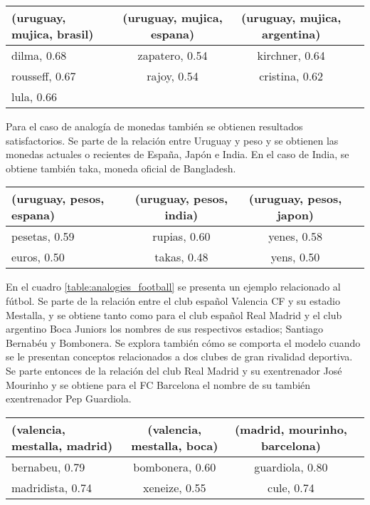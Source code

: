 \begin{table*}[ht]
    \centering
    \begin{tabular}{lccc}
        \hline
        (uruguay, mujica, brasil) & (uruguay, mujica, espana) & (uruguay, mujica, argentina)\\
        \hline
        dilma, 0.68 & zapatero, 0.54 & kirchner, 0.64\\
        rousseff, 0.67 & rajoy, 0.54 & cristina, 0.62\\
        lula, 0.66\\
        \hline
    \end{tabular}
    \caption{Analogías para países y presidentes.}
    \label{table:analogies_presidents}
\end{table*}

Para el caso de analogía de monedas también se obtienen resultados satisfactorios. Se parte de
la relación entre Uruguay y peso y se obtienen las monedas actuales o recientes de España, Japón
e India. En el caso de India, se obtiene también taka, moneda oficial de Bangladesh.

\begin{table*}[ht]
    \centering
    \begin{tabular}{lccc}
        \hline
        (uruguay, pesos, espana) & (uruguay, pesos, india) & (uruguay, pesos, japon)\\
        \hline
        pesetas, 0.59 & rupias, 0.60 & yenes, 0.58\\
        euros, 0.50 & takas, 0.48 & yens, 0.50\\
        \hline
    \end{tabular}
    \caption{Analogías para países y monedas.}
    \label{table:analogies_currencies}
\end{table*}

En el cuadro \ref{table:analogies_football} se presenta un ejemplo relacionado al fútbol. Se
parte de la relación entre el club español Valencia CF y su estadio Mestalla, y se obtiene tanto
como para el club español Real Madrid y el club argentino Boca Juniors los nombres de sus
respectivos estadios; Santiago Bernabéu y Bombonera. Se explora también cómo se
comporta el modelo cuando se le presentan conceptos relacionados a dos clubes de gran
rivalidad deportiva. Se parte entonces de la relación del club Real Madrid y su exentrenador
José Mourinho y se obtiene para el FC Barcelona el nombre de su también exentrenador Pep
Guardiola.

\begin{table*}[ht]
    \centering
    \begin{tabular}{lccc}
        \hline
        (valencia, mestalla, madrid) & (valencia, mestalla, boca) & (madrid, mourinho, barcelona)\\
        \hline
        bernabeu, 0.79 & bombonera, 0.60 & guardiola, 0.80\\
        madridista, 0.74 & xeneize, 0.55 & cule, 0.74\\
        \hline
    \end{tabular}
    \caption{Analogías relacionadas al fútbol.}
    \label{table:analogies_football}
\end{table*}

